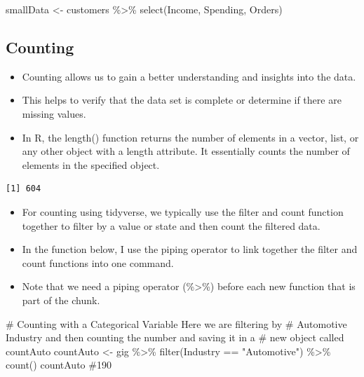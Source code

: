 \documentclass[
  letterpaper,
  DIV=11,
  numbers=noendperiod]{scrreprt}
\newenvironment{Shaded}{\begin{snugshade}}{\end{snugshade}}
\newcommand{\CommentTok}[1]{\textcolor[rgb]{0.37,0.37,0.37}{#1}}
\newcommand{\FunctionTok}[1]{\textcolor[rgb]{0.28,0.35,0.67}{#1}}
\newcommand{\NormalTok}[1]{\textcolor[rgb]{0.00,0.23,0.31}{#1}}
\newcommand{\OtherTok}[1]{\textcolor[rgb]{0.00,0.23,0.31}{#1}}
\newcommand{\SpecialCharTok}[1]{\textcolor[rgb]{0.37,0.37,0.37}{#1}}
\newcommand{\StringTok}[1]{\textcolor[rgb]{0.13,0.47,0.30}{#1}}
\providecommand{\tightlist}{%
  \setlength{\itemsep}{0pt}\setlength{\parskip}{0pt}}\usepackage{longtable,booktabs,array}
\begin{document}
\begin{Shaded}
\begin{Highlighting}[]
\NormalTok{smallData }\OtherTok{\textless{}{-}}\NormalTok{ customers }\SpecialCharTok{\%\textgreater{}\%}
    \FunctionTok{select}\NormalTok{(Income, Spending, Orders)}
\end{Highlighting}
\end{Shaded}

\subsection{Counting}\label{counting}

\begin{itemize}
\item
  Counting allows us to gain a better understanding and insights into
  the data.
\item
  This helps to verify that the data set is complete or determine if
  there are missing values.
\item
  In R, the length() function returns the number of elements in a
  vector, list, or any other object with a length attribute. It
  essentially counts the number of elements in the specified object.
\end{itemize}

\begin{Shaded}
\end{Shaded}

\begin{verbatim}
[1] 604
\end{verbatim}

\begin{itemize}
\tightlist
\item
  For counting using tidyverse, we typically use the filter and count
  function together to filter by a value or state and then count the
  filtered data.
\item
  In the function below, I use the piping operator to link together the
  filter and count functions into one command.
\item
  Note that we need a piping operator (\%\textgreater\%) before each new
  function that is part of the chunk.
\end{itemize}

\begin{Shaded}
\begin{Highlighting}[]
\CommentTok{\# Counting with a Categorical Variable Here we are filtering by}
\CommentTok{\# Automotive Industry and then counting the number and saving it in a}
\CommentTok{\# new object called countAuto}
\NormalTok{countAuto }\OtherTok{\textless{}{-}}\NormalTok{ gig }\SpecialCharTok{\%\textgreater{}\%}
    \FunctionTok{filter}\NormalTok{(Industry }\SpecialCharTok{==} \StringTok{"Automotive"}\NormalTok{) }\SpecialCharTok{\%\textgreater{}\%}
    \FunctionTok{count}\NormalTok{()}
\NormalTok{countAuto  }\CommentTok{\#190}
\end{Highlighting}
\end{Shaded}
\end{document}
